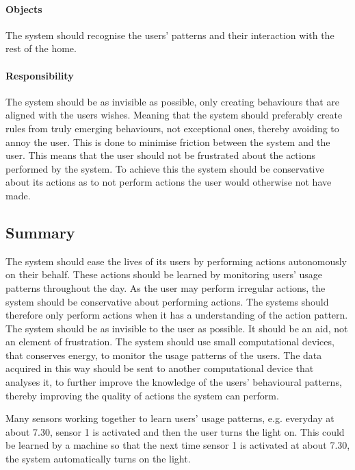 \paragraph{Objects}
The system should recognise the users' patterns and their interaction with the rest of the home.

\paragraph{Responsibility}
The system should be as invisible as possible, only creating behaviours that are aligned with the users wishes. Meaning that the system should preferably create rules from truly emerging behaviours, not exceptional ones, thereby avoiding to annoy the user. This is done to minimise friction between the system and the user. This means that the user should not be frustrated about the actions performed by the system. To achieve this the system should be conservative about its actions as to not perform actions the user would otherwise not have made.

\subsection{Summary}
The system should ease the lives of its users by performing actions autonomously on their behalf. These actions should be learned by monitoring users' usage patterns throughout the day. As the user may perform irregular actions, the system should be conservative about performing actions. The systems should therefore only perform actions when it has a understanding of the action pattern. The system should be as invisible to the user as possible. It should be an aid, not an element of frustration. The system should use small computational devices, that conserves energy, to monitor the usage patterns of the users. The data acquired in this way should be sent to another computational device that analyses it, to further improve the knowledge of the users' behavioural patterns, thereby improving the quality of actions the system can perform.

Many sensors working together to learn users’ usage patterns, e.g. everyday at about 7.30, sensor 1 is activated and then the user turns the light on. This could be learned by a machine so that the next time sensor 1 is activated at about 7.30, the system automatically turns on the light.
